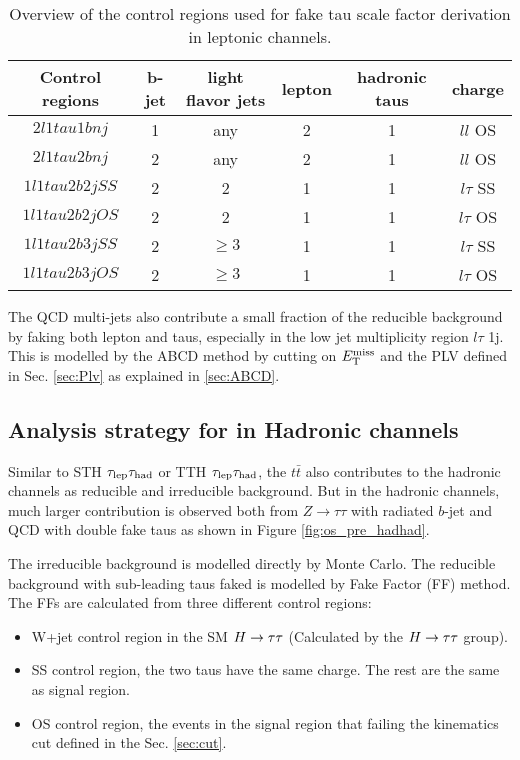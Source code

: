 \begin{table}
\centering
\caption{Overview of the control regions used for fake tau scale factor derivation in leptonic channels.}
\label{tab:sfcr}
\begin{tabular}[h]{c|c|c|c|c|c}
\hline \hline
Control regions & b-jet & light flavor jets	& lepton & hadronic taus & charge\\ \hline
$2l1tau1bnj$	& 1     & any				& 2      & 1			 & $ll$ OS\\ \hline
$2l1tau2bnj$	& 2     & any				& 2      & 1			 & $ll$ OS\\ \hline
$1l1tau2b2j SS$	& 2     & 2 				& 1      & 1             & $l\tau$ SS\\ \hline
$1l1tau2b2j OS$	& 2     & 2      			& 1      & 1             & $l\tau$ OS\\ \hline
$1l1tau2b3j SS$	& 2     & $\ge3$ 			& 1      & 1             & $l\tau$ SS\\ \hline
$1l1tau2b3j OS$	& 2     & $\ge3$      		& 1      & 1             & $l\tau$ OS\\ \hline
\end{tabular}
\end{table}

The QCD multi-jets also contribute a small fraction of the reducible background by faking both lepton and taus, especially in the low jet multiplicity region $l\tau$ 1j. This is modelled by the ABCD method by cutting on $E_{\text{T}}^{\text{miss}}$ and the PLV defined in Sec. \ref{sec:Plv} as explained in \ref{sec:ABCD}.

\subsection{Analysis strategy for in Hadronic channels}

Similar to STH $\tau_\text{lep}{}\tau_\text{had}$ or TTH $\tau_\text{lep}{}\tau_\text{had}$, the $t\bar{t}$ also contributes to the hadronic channels as reducible and irreducible background. But in the hadronic channels, much larger contribution is observed both from $Z\to \tau\tau$ with radiated $b$-jet and QCD with double fake taus as shown in Figure \ref{fig:os_pre_hadhad}. 

The irreducible background is modelled directly by Monte Carlo. The reducible background with sub-leading taus faked is modelled by Fake Factor (FF) method. The FFs are calculated from three different control regions:

\begin{itemize}
	\item W+jet control region in the SM $H \rightarrow \tau\tau$ (Calculated by the $H \rightarrow \tau\tau$ group).
	\item SS control region, the two taus have the same charge. The rest are the same as signal region.
	\item OS control region, the events in the signal region that failing the kinematics cut defined in the Sec. \ref{sec:cut}.
\end{itemize}

